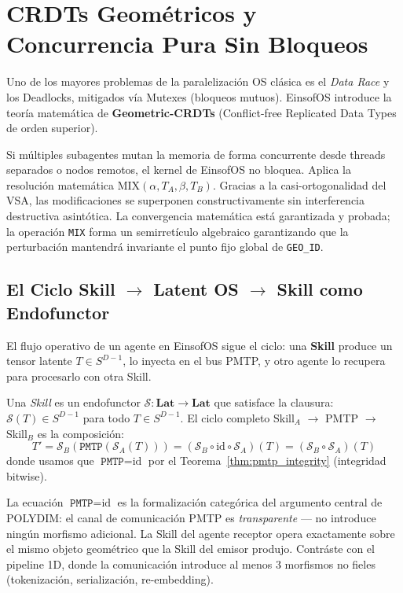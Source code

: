 \section{CRDTs Geométricos y Concurrencia Pura Sin Bloqueos}
Uno de los mayores problemas de la paralelización OS clásica es el \textit{Data Race} y los Deadlocks, mitigados vía Mutexes (bloqueos mutuos). EinsofOS introduce la teoría matemática de \textbf{Geometric-CRDTs} (Conflict-free Replicated Data Types de orden superior).

Si múltiples subagentes mutan la memoria de forma concurrente desde threads separados o nodos remotos, el kernel de EinsofOS no bloquea. Aplica la resolución matemática $\text{MIX}(\alpha, T_A, \beta, T_B)$. Gracias a la casi-ortogonalidad del VSA, las modificaciones se superponen constructivamente sin interferencia destructiva asintótica. La convergencia matemática está garantizada y probada; la operación \texttt{MIX} forma un semirretículo algebraico garantizando que la perturbación mantendrá invariante el punto fijo global de \texttt{GEO\_ID}.

\subsection{El Ciclo Skill $\to$ Latent OS $\to$ Skill como Endofunctor}


El flujo operativo de un agente en EinsofOS sigue el ciclo:
una \textbf{Skill} produce un tensor latente $T \in S^{D-1}$, lo inyecta 
en el bus PMTP, y otro agente lo recupera para procesarlo con otra Skill.

\begin{definition}

Una \emph{Skill} es un endofunctor $\mathcal{S}: \mathbf{Lat} \to \mathbf{Lat}$
que satisface la clausura: $\mathcal{S}(T) \in S^{D-1}$ para todo 
$T \in S^{D-1}$. El ciclo completo Skill$_A$ $\to$ PMTP $\to$ Skill$_B$ 
es la composición:
\begin{equation}
T' = \mathcal{S}_B\!\left(\texttt{PMTP}(\mathcal{S}_A(T))\right) 
= (\mathcal{S}_B \circ \text{id} \circ \mathcal{S}_A)(T)
= (\mathcal{S}_B \circ \mathcal{S}_A)(T)
\end{equation}
donde usamos que $\texttt{PMTP} = \text{id}$ por el 
Teorema~\ref{thm:pmtp_integrity} (integridad bitwise).
\end{definition}

\begin{remark}

La ecuación $\texttt{PMTP} = \text{id}$ es la formalización categórica
del argumento central de POLYDIM: el canal de comunicación PMTP es
\emph{transparente} --- no introduce ningún morfismo adicional. La Skill 
del agente receptor opera exactamente sobre el mismo objeto geométrico que
la Skill del emisor produjo. Contráste con el pipeline 1D, donde la 
comunicación introduce al menos 3 morfismos no fieles (tokenización, 
serialización, re-embedding).
\end{remark}

